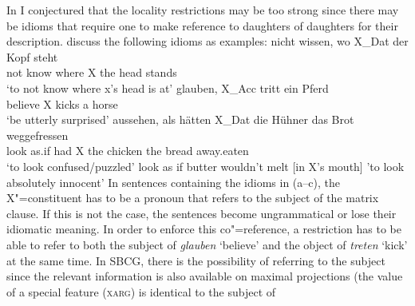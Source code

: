 
In  I conjectured that the locality restrictions
may be too strong since there may be idioms that require one to make reference to daughters of daughters for their description.   discuss the following idioms as examples:
\eal
\label{ex-idiom-non-nominative-external}
\ex 
\gll nicht wissen, wo    X\_Dat der Kopf steht\\
     not   know    where X     the head stands\\
\glt `to not know where x's head is at'
\ex\label{mich-tritt-ein-Pferd}
\gll glauben, X\_Acc tritt ein Pferd\\
     believe  X     kicks a horse\\
\glt `be utterly surprised'
\ex 
\gll aussehen, als hätten X\_Dat die Hühner das Brot weggefressen\\
	 look as.if had X the chicken the bread away.eaten\\
\glt `to look confused/puzzled'
\ex
\label{ex-look-as-if-butter}
look as if butter wouldn't melt [in X's mouth]
\glt 'to look absolutely innocent'
\zl
In sentences containing the idioms in (a--c), the X"=constituent has to be a pronoun that
refers to the subject of the matrix clause. If this is not the case, the sentences become ungrammatical or lose their idiomatic meaning.
\eal
{}
\zl
In order to enforce this co"=reference, a restriction has to be able to refer to both the subject of \emph{glauben} `believe' and the object
of \emph{treten} `kick' at the same time. In SBCG, there is the possibility of referring to the subject since the relevant information
is also available on maximal projections (the value of a special feature (\textsc{xarg}) is identical to the subject of
